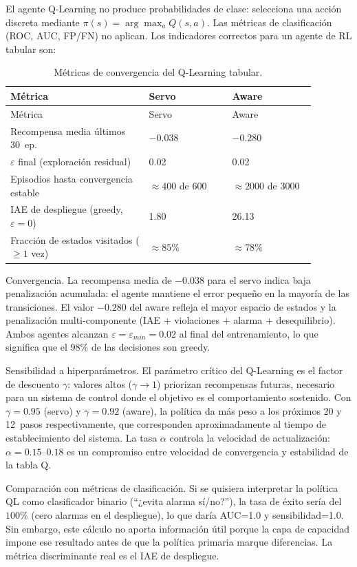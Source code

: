 El agente Q-Learning no produce probabilidades de clase: selecciona una acción discreta mediante $\pi(s)=\arg\max_a Q(s,a)$. Las métricas de clasificación (ROC, AUC, FP/FN) no aplican. Los indicadores correctos para un agente de RL tabular son:

\begin{longtable}{@{}P{0.40\linewidth}P{0.24\linewidth}P{0.24\linewidth}@{}}
\caption{Métricas de convergencia del Q-Learning tabular.}
\label{tab:ql_metrics}\\
\toprule
Métrica & Servo & Aware \\ \midrule \endfirsthead
\toprule Métrica & Servo & Aware \\ \midrule \endhead
Recompensa media últimos 30~ep. & $-0.038$ & $-0.280$ \\
$\varepsilon$ final (exploración residual) & 0.02 & 0.02 \\
Episodios hasta convergencia estable & $\approx400$ de 600 & $\approx2000$ de 3000 \\
IAE de despliegue (greedy, $\varepsilon=0$) & 1.80 & 26.13 \\
Fracción de estados visitados ($\geq1$ vez) & $\approx85\%$ & $\approx78\%$ \\
\bottomrule
\end{longtable}

Convergencia. La recompensa media de $-0.038$ para el servo indica baja penalización acumulada: el agente mantiene el error pequeño en la mayoría de las transiciones. El valor $-0.280$ del aware refleja el mayor espacio de estados y la penalización multi-componente (IAE + violaciones + alarma + desequilibrio). Ambos agentes alcanzan $\varepsilon=\varepsilon_{min}=0.02$ al final del entrenamiento, lo que significa que el $98\%$ de las decisiones son greedy.

Sensibilidad a hiperparámetros. El parámetro crítico del Q-Learning es el factor de descuento $\gamma$: valores altos ($\gamma\to1$) priorizan recompensas futuras, necesario para un sistema de control donde el objetivo es el comportamiento sostenido. Con $\gamma=0.95$ (servo) y $\gamma=0.92$ (aware), la política da más peso a los próximos 20 y 12~pasos respectivamente, que corresponden aproximadamente al tiempo de establecimiento del sistema. La tasa $\alpha$ controla la velocidad de actualización: $\alpha=0.15$--$0.18$ es un compromiso entre velocidad de convergencia y estabilidad de la tabla Q.

Comparación con métricas de clasificación. Si se quisiera interpretar la política QL como clasificador binario (``¿evita alarma sí/no?''), la tasa de éxito sería del $100\%$ (cero alarmas en el despliegue), lo que daría AUC=1.0 y sensibilidad=1.0. Sin embargo, este cálculo no aporta información útil porque la capa de capacidad impone ese resultado antes de que la política primaria marque diferencias. La métrica discriminante real es el IAE de despliegue.
